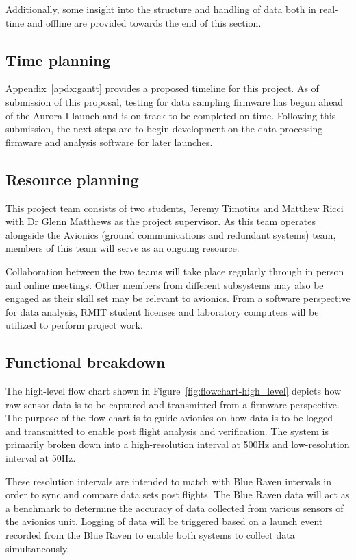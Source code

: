 Additionally, some insight into the structure and handling of data both in real-time and offline are provided towards the end of this section.

\subsection{Time planning}
Appendix~\ref{apdx:gantt} provides a proposed timeline for this project. As of submission of this proposal, testing for data sampling firmware has begun ahead of the Aurora I launch and is on track to be completed on time. Following this submission, the next steps are to begin development on the data processing firmware and analysis software for later launches.

\subsection{Resource planning}
This project team consists of two students, Jeremy Timotius and Matthew Ricci with Dr Glenn Matthews as the project supervisor. As this team operates alongside the Avionics (ground communications and redundant systems) team, members of this team will serve as an ongoing resource. 

Collaboration between the two teams will take place regularly through in person and online meetings. Other members from different subsystems may also be engaged as their skill set may be relevant to avionics. From a software perspective for data analysis, RMIT student licenses and laboratory computers will be utilized to perform project work.  

\subsection{Functional breakdown}
The high-level flow chart shown in Figure~\ref{fig:flowchart-high_level} depicts how raw sensor data is to be captured and transmitted from a firmware perspective. The purpose of the flow chart is to guide avionics on how data is to be logged and transmitted to enable post flight analysis and verification. The system is primarily broken down into a high-resolution interval at 500Hz and low-resolution interval at 50Hz. 

These resolution intervals are intended to match with Blue Raven intervals in order to sync and compare data sets post flights. The Blue Raven data will act as a benchmark to determine the accuracy of data collected from various sensors of the avionics unit. Logging of data will be triggered based on a launch event recorded from the Blue Raven to enable both systems to collect data simultaneously. 

